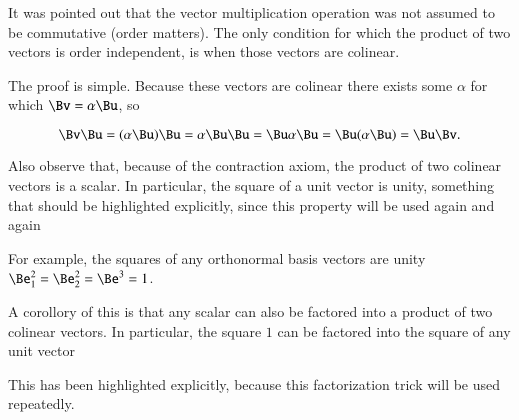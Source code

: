 %
%
It was pointed out that the vector multiplication operation was not assumed to be commutative (order matters).  The only condition for which the product of two vectors is order independent, is when those vectors are colinear.


The proof is simple.  Because these vectors are colinear there exists some \( \alpha \) for which \( \Bv = \alpha \Bu \), so

\begin{dmath}\label{eqn:multivector:380}
\Bv \Bu
=
(\alpha \Bu) \Bu
=
\alpha \Bu \Bu
=
\Bu \alpha \Bu
=
\Bu (\alpha \Bu)
=
\Bu \Bv.
\end{dmath}

Also observe that, because of the contraction axiom, the product of two colinear vectors is a scalar.  In particular, the square of a unit vector is unity, something that should be highlighted explicitly, since this property will be used again and again

For example, the squares of any orthonormal basis vectors are unity \( \Be_1^2 = \Be_2^2 = \Be^3 = 1 \).

A corollory of this is that any scalar can also be factored into a product of two colinear vectors.
In particular, the square \( 1 \) can be factored into the square of any unit vector


This has been highlighted explicitly, because this factorization trick will be used repeatedly.
